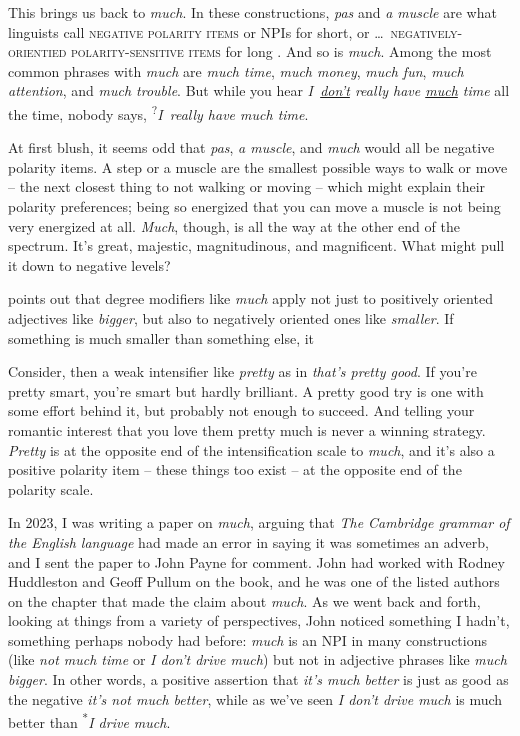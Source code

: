 This brings us back to \textit{much}. In these constructions, \textit{pas} and \textit{a muscle} are what linguists call \textsc{negative polarity items} or NPIs for short, or \dots~\textsc{negatively-orientied polarity-sensitive items} for long \citep{cgel}. And so is \textit{much}. Among the most common phrases with \textit{much} are \textit{much time}, \textit{much money}, \textit{much fun}, \textit{much attention}, and \textit{much trouble}. But while you hear \textit{I~\uline{don't} really have \uline{much} time} all the time, nobody says, \textsuperscript{?}\textit{I~really have much time}.

At first blush, it seems odd that \textit{pas}, \textit{a muscle}, and \textit{much} would all be negative polarity items. A step or a muscle are the smallest possible ways to walk or move -- the next closest thing to not walking or moving -- which might explain their polarity preferences; being so energized that you can move a muscle is not being very energized at all. \textit{Much}, though, is all the way at the other end of the spectrum. It's great, majestic, magnitudinous, and magnificent. What might pull it down to negative levels?

\citet[82]{Israel2011} points out that degree modifiers like \textit{much} apply not just to positively oriented adjectives like \textit{bigger}, but also to negatively oriented ones like \textit{smaller}. If something is much smaller than something else, it

Consider, then a weak intensifier like \textit{pretty} as in \textit{that's pretty good}. If you're pretty smart, you're smart but hardly brilliant. A pretty good try is one with some effort behind it, but probably not enough to succeed. And telling your romantic interest that you love them pretty much is never a winning strategy. \textit{Pretty} is at the opposite end of the intensification scale to \textit{much}, and it's also a positive polarity item -- these things too exist -- at the opposite end of the polarity scale.



In 2023, I was writing a paper on \textit{much}, arguing that \textit{The Cambridge grammar of the English language} had made an error in saying it was sometimes an adverb, and I sent the paper to John Payne for comment. John had worked with Rodney Huddleston and Geoff Pullum on the book, and he was one of the listed authors on the chapter that made the claim about \textit{much}. As we went back and forth, looking at things from a variety of perspectives, John noticed something I hadn't, something perhaps nobody had before: \textit{much} is an NPI in many constructions (like \textit{not much time} or \textit{I don't drive much}) but not in adjective phrases like \textit{much bigger}. In other words, a positive assertion that \textit{it's much better} is just as good as the negative \textit{it's not much better}, while as we've seen \textit{I don't drive much} is much better than \textsuperscript{*}\textit{I drive much}.




